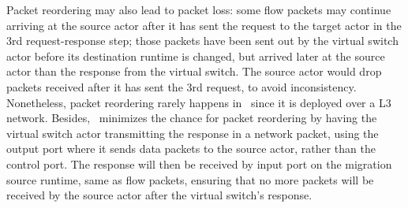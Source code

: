  Packet reordering may also lead to packet loss: some flow packets may continue arriving at the source actor after it has sent the request to the target actor in the 3rd request-response step; those packets have been sent out by the virtual switch actor before its destination runtime is changed, but arrived later at the source actor than the response from the virtual switch. %
 The source actor would drop packets received after it has sent the 3rd request, to avoid inconsistency. Nonetheless, packet reordering rarely happens in \nfactor~since it is deployed over a L3 network. Besides, \nfactor~minimizes the chance for packet reordering by having the virtual switch actor transmitting the response in a network packet, using the output port where it sends data packets to the source actor, rather than the control port. The response will then be received by input port on the migration source runtime, same as flow packets, ensuring that no more packets will be received by the source actor after the virtual switch's response.





